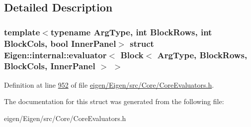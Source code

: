 \subsection{Detailed Description}
\subsubsection*{template$<$typename Arg\+Type, int Block\+Rows, int Block\+Cols, bool Inner\+Panel$>$\newline
struct Eigen\+::internal\+::evaluator$<$ Block$<$ Arg\+Type, Block\+Rows, Block\+Cols, Inner\+Panel $>$ $>$}



Definition at line \hyperlink{eigen_2_eigen_2src_2_core_2_core_evaluators_8h_source_l00952}{952} of file \hyperlink{eigen_2_eigen_2src_2_core_2_core_evaluators_8h_source}{eigen/\+Eigen/src/\+Core/\+Core\+Evaluators.\+h}.



The documentation for this struct was generated from the following file\+:\begin{DoxyCompactItemize}
\item 
eigen/\+Eigen/src/\+Core/\+Core\+Evaluators.\+h\end{DoxyCompactItemize}
